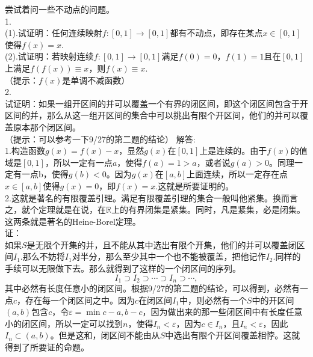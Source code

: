 \documentclass[11pt,a4paper,openany]{article}
\begin{document}
尝试着问一些不动点的问题。\\
1.\\
(1).试证明：任何连续映射$f:[0,1]\rightarrow[0,1]$都有不动点，即存在某点$x \in [0,1]$使得$f(x)=x$.\\
(2).试证明：若映射连续$f:[0,1]\rightarrow[0,1]$满足$f(0)=0$，$f(1)=1$且在$[0,1]$上满足$f(f(x))\equiv x$，则$f(x)\equiv x$.\\
（提示：$f(x)$是单调不减函数）\\
2.\\
试证明：如果一组开区间的并可以覆盖一个有界的闭区间，即这个闭区间包含于开区间的并，那么从这一组开区间的集合中可以挑出有限个开区间，他们的并可以覆盖原本那个闭区间。\\（提示：可以参考一下9/27的第二题的结论）
\newpage
解答:\\
1.构造函数$g(x)=f(x)-x$，显然$g(x)$在$[0,1]$上是连续的。由于$f(x)$的值域是$[0,1]$，所以一定有一点$a$，使得$f(a)=1>a$，或者说$g(a)>0$。同理一定有一点b，使得$g(b)<0$。因为$g(x)$在$[a,b]$上面连续，所以一定存在点$x\in [a,b]$使得$g(x)=0$，即$f(x)=x$.这就是所要证明的。\\
2.这就是著名的有限覆盖引理。满足有限覆盖引理的集合一般叫他紧集。换而言之，就个定理就是在说，在$\mathbb{R}$上的有界闭集是紧集。同时，凡是紧集，必是闭集。这两条就是著名的Heine-Borel定理。\\
证：\\
如果$S$是无限个开集的并，且不能从其中选出有限个开集，他们的并可以覆盖闭区间$I_1$.那么不妨将$I_1$对半分，那么至少其中一个也不能被覆盖，把他记作$I_2$.同样的手续可以无限做下去。那么就得到了这样的一个闭区间的序列。
\[
I_1\supset I_2 \supset \cdots \supset I_n \supset \cdots,
\]
其中必然有长度任意小的闭区间。根据9/27的第二题的结论，可以得到，必然有一点$c$，存在每一个闭区间之中。因为$c$在闭区间$I_1$中，则必然有一个$S$中的开区间$(a,b)$包含$c$，令$\varepsilon=\min{c-a,b-c}$，因为做出来的那一些闭区间中有长度任意小的闭区间，所以一定可以找到$n$，使得$I_n<\varepsilon$，因为$c\in I_n$，且$I_n<\varepsilon$，因此$I_n\subset (a,b)$。但是这和，闭区间不能由从$S$中选出有限个开区间覆盖相悖。这就得到了所要证的命题。
\end{document}
